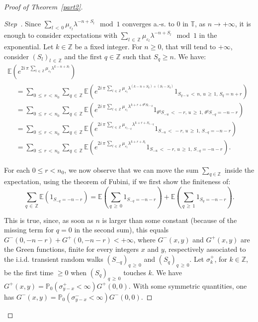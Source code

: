 \documentclass[10pt]{amsart}
\theoremstyle{definition}\newtheorem{defi}[theo]{Definition}\newtheorem{rema}[theo]{Remark}\newtheorem{exam}[theo]{Example}\newtheorem{exem}[theo]{Example}\newtheorem{nota}[theo]{Notation}
\newcommand{\Pbb}{\mathbb P}
\newcommand{\Ebb}{\mathbb E}
\newcommand{\Tbb}{\mathbb T}
\newcommand{\Zbb}{\mathbb Z}
\newcounter{stepcount}
\newenvironment{step}{\refstepcounter{stepcount}\begin{proof}[Step~\thestepcount]}{\let\qed\relax\end{proof}}
\begin{document}
\begin{proof}[{Proof of Theorem~\ref{part2}}]
\begin{step}
Since $\sum_{l\,<\,0}\mu_{\varepsilon_l}\lambda^{-n+S_l}\mod1$ converges a.-s. to 0 in $\Tbb$, as $n\rightarrow+\infty$, it is enough to consider expectations with $\sum_{l\,\in\,\Zbb}\mu_{\varepsilon_l}\lambda^{-n+S_l}\mod1$ in the exponential. Let $k\in\Zbb$ be a fixed integer. For $n\geq0$, that will tend to $+\infty$, consider $(S_l)_{l\,\in\,\Zbb}$ and the first $q\in\Zbb$ such that $S_q\geq n$. We have:
\begin{multline*}
\Ebb\left({e^{2i\,\pi\,\sum_{l\,\in\,\Zbb}\mu_{\varepsilon_l}\lambda^{k-n+S_l}}}\right)\\
\begin{aligned}
&=\sum_{0\,\leq\,r\,<\,n_0}\sum_{q\,\in\,\Zbb}\Ebb\left({e^{2i\,\pi\,\sum_{l\,\in\,\Zbb}\mu_{\varepsilon_l}\lambda^{(k-n+S_q)+(S_l-S_q)}}1_{S_{q-u}\,<\,n,\,u\,\geq\,1,\,S_{q}=n+r}}\right)\\
&=\sum_{0\,\leq\,r\,<\,n_0}\sum_{q\,\in\,\Zbb}\Ebb\left({e^{2i\,\pi\,\sum_{l\,\in\,\Zbb}\mu_{\varepsilon_l}\lambda^{k+r+\theta^qS_{l-q}}}1_{\theta^qS_{-u}\,<\,-r,\,u\,\geq\,1,\,\theta^qS_{-q}=-n-r}}\right)\\
&=\sum_{0\,\leq\,r\,<\,n_0}\sum_{q\,\in\,\Zbb}\Ebb\left({e^{2i\,\pi\,\sum_{l\,\in\,\Zbb}\mu_{\varepsilon_{l-q}}\lambda^{k+r+S_{l-q}}}1_{S_{-u}\,<\,-r,\,u\,\geq\,1,\,S_{-q}=-n-r}}\right)\\
&=\sum_{0\,\leq\,r\,<\,n_0}\sum_{q\,\in\,\Zbb}\Ebb\left({e^{2i\,\pi\,\sum_{l\,\in\,\Zbb}\mu_{\varepsilon_{l}}\lambda^{k+r+S_{l}}}1_{S_{-u}\,<\,-r,\,u\,\geq\,1,\,S_{-q}=-n-r}}\right).
\end{aligned}
\end{multline*}


For each $0\leq r<n_0$, we now observe that we can move the sum $\sum_{q\in\Zbb}$ inside the expectation, using the theorem of Fubini, if we first show the finiteness of:
\[
\sum_{q\,\in\,\Zbb}\Ebb\left({1_{S_{-q}=-n-r}}\right)=\Ebb\left({\sum_{q\,\geq\,0}1_{S_{-q}=-n-r}}\right)+\Ebb\left({\sum_{q\,\geq\,1}1_{S_{q}=-n-r}}\right).
\]

This is true, since, as soon as $n$ is larger than some constant (because of the missing term for $q=0$ in the second sum), this equals $G^-(0,-n-r)+G^+(0,-n-r)<+\infty$, where $G^-(x,y)$ and $G^+(x,y)$ are the Green functions, finite for every integers $x$ and $y$, respectively associated to the i.i.d. transient random walks $(S_{-q})_{q\,\geq\,0}$ and $(S_{q})_{q\,\geq\,0}$. Let $\sigma^+_k$, for $k\in\Zbb$, be the first time $\geq0$ when $(S_{q})_{q\,\geq\,0}$ touches $k$. We have $G^+(x,y)=\Pbb_0(\sigma^+_{y-x}<\infty)G^+(0,0)$. With some symmetric quantities, one has $G^-(x,y)=\Pbb_0(\sigma^-_{y-x}<\infty)G^-(0,0)$.


\end{step}
\end{proof}
\end{document}
